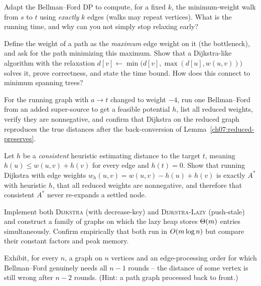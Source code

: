 \begin{exercise}
Adapt the Bellman--Ford DP to compute, for a fixed $k$, the minimum-weight walk from $s$ to
$t$ using \emph{exactly} $k$ edges (walks may repeat vertices). What is the running time, and
why can you not simply stop relaxing early?
\end{exercise}

\begin{exercise}
Define the weight of a path as the \emph{maximum} edge weight on it (the bottleneck), and ask
for the path minimizing this maximum. Show that a Dijkstra-like algorithm with the
relaxation $d[v]\gets\min\bigl(d[v],\max(d[u],w(u,v))\bigr)$ solves it, prove correctness,
and state the time bound. How does this connect to minimum spanning trees?
\end{exercise}

\begin{exercise}
For the running graph with $a\to t$ changed to weight $-4$, run one Bellman--Ford from an
added super-source to get a feasible potential $h$, list all reduced weights, verify they are
nonnegative, and confirm that Dijkstra on the reduced graph reproduces the true distances
after the back-conversion of Lemma~\ref{ch07:reduced-preserves}.
\end{exercise}

\begin{exercise}
Let $h$ be a \emph{consistent} heuristic estimating distance to the target $t$, meaning
$h(u)\le w(u,v)+h(v)$ for every edge and $h(t)=0$. Show that running Dijkstra with edge
weights $w_h(u,v)=w(u,v)-h(u)+h(v)$ is exactly $A^\ast$ with heuristic $h$, that all reduced
weights are nonnegative, and therefore that consistent $A^\ast$ never re-expands a settled
node.
\end{exercise}

\begin{exercise}
Implement both \textsc{Dijkstra} (with decrease-key) and \textsc{Dijkstra-Lazy} (push-stale)
and construct a family of graphs on which the lazy heap stores $\Theta(m)$ entries
simultaneously. Confirm empirically that both run in $O(m\log n)$ but compare their
constant factors and peak memory.
\end{exercise}

\begin{exercise}
Exhibit, for every $n$, a graph on $n$ vertices and an edge-processing order for which
Bellman--Ford genuinely needs all $n-1$ rounds -- the distance of some vertex is still wrong
after $n-2$ rounds. (Hint: a path graph processed back to front.)
\end{exercise}
